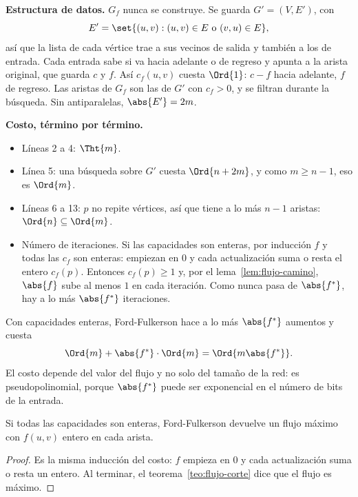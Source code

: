 \documentclass[11pt,letterpaper]{article}
\begin{document}
\textbf{Estructura de datos.} $G_f$ nunca se construye. Se guarda
$G' = (V, E')$, con
\[
  E' = \set{(u, v) : (u, v) \in E \text{ o } (v, u) \in E} ,
\]
así que la lista de cada vértice trae a sus vecinos de salida y
también a los de entrada. Cada entrada sabe si va hacia adelante o
de regreso y apunta a la arista original, que guarda $c$ y $f$. Así
$c_f(u, v)$ cuesta $\Ord{1}$: $c - f$ hacia adelante, $f$ de regreso.
Las aristas de $G_f$ son las de $G'$ con $c_f > 0$, y se filtran
durante la búsqueda. Sin antiparalelas, $\abs{E'} = 2m$.

\textbf{Costo, término por término.}
\begin{itemize}[beginpenalty=10000]
  \item Líneas 2 a 4: $\Tht{m}$.
  \item Línea 5: una búsqueda sobre $G'$ cuesta $\Ord{n + 2m}$, y
        como $m \ge n - 1$, eso es $\Ord{m}$.
  \item Líneas 6 a 13: $p$ no repite vértices, así que tiene a lo más
        $n - 1$ aristas: $\Ord{n} \subseteq \Ord{m}$.
  \item Número de iteraciones. Si las capacidades son enteras, por
        inducción $f$ y todas las $c_f$ son enteras: empiezan en $0$ y
        cada actualización suma o resta el entero $c_f(p)$. Entonces
        $c_f(p) \ge 1$ y, por el lema~\ref{lem:flujo-camino},
        $\abs{f}$ sube al menos $1$ en cada iteración. Como nunca pasa
        de $\abs{f^*}$, hay a lo más $\abs{f^*}$ iteraciones.
\end{itemize}

\begin{resultado}
  Con capacidades enteras, Ford-Fulkerson hace a lo más $\abs{f^*}$
  aumentos y cuesta
  \[
    \Ord{m} + \abs{f^*} \cdot \Ord{m} = \Ord{m \abs{f^*}} .
  \]
  El costo depende del valor del flujo y no solo del tamaño de la red:
  es pseudopolinomial, porque $\abs{f^*}$ puede ser exponencial en el
  número de bits de la entrada.
\end{resultado}

\begin{corolario}[Integralidad]\label{cor:flujo-integralidad}
  Si todas las capacidades son enteras, Ford-Fulkerson devuelve un
  flujo máximo con $f(u, v)$ entero en cada arista.
\end{corolario}

\begin{proof}
  Es la misma inducción del costo: $f$ empieza en $0$ y cada
  actualización suma o resta un entero. Al terminar, el
  teorema~\ref{teo:flujo-corte} dice que el flujo es máximo.
\end{proof}
\end{document}
